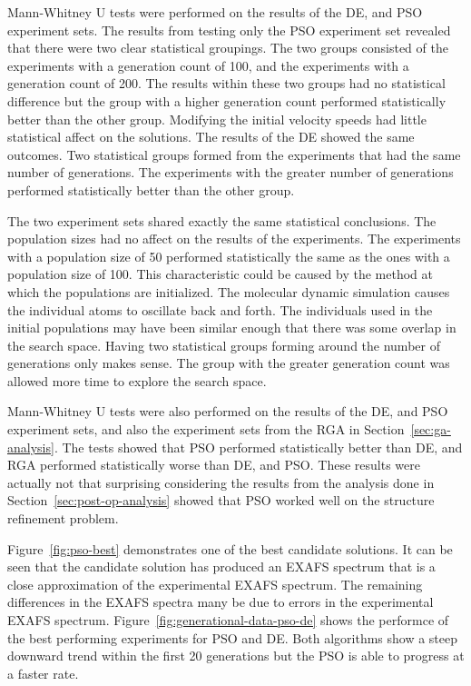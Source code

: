 Mann-Whitney U tests were performed on the results of the DE, and PSO experiment sets. The results from testing only the PSO experiment set revealed that there were two clear statistical groupings. The two groups consisted of the experiments with a generation count of 100, and the experiments with a generation count of 200. The results within these two groups had no statistical difference but the group with a higher generation count performed statistically better than the other group. Modifying the initial velocity speeds had little statistical affect on the solutions. The results of the DE showed the same outcomes. Two statistical groups formed from the experiments that had the same number of generations. The experiments with the greater number of generations performed statistically better than the other group.

The two experiment sets shared exactly the same statistical conclusions. The population sizes had no affect on the results of the experiments. The experiments with a population size of 50 performed statistically the same as the ones with a population size of 100. This characteristic could be caused by the method at which the populations are initialized. The molecular dynamic simulation causes the individual atoms to oscillate back and forth. The individuals used in the initial populations may have been similar enough that there was some overlap in the search space. Having two statistical groups forming around the number of generations only makes sense. The group with the greater generation count was allowed more time to explore the search space.

Mann-Whitney U tests were also performed on the results of the DE, and PSO experiment sets, and also the experiment sets from the RGA in Section~\ref{sec:ga-analysis}. The tests showed that PSO performed statistically better than DE, and RGA performed statistically worse than DE, and PSO. These results were actually not that surprising considering the results from the analysis done in Section~\ref{sec:post-op-analysis} showed that PSO worked well on the structure refinement problem.

Figure~\ref{fig:pso-best} demonstrates one of the best candidate solutions. It can be seen that the candidate solution has produced an EXAFS spectrum that is a close approximation of the experimental EXAFS spectrum. The remaining differences in the EXAFS spectra many be due to errors in the experimental EXAFS spectrum. Figure~\ref{fig:generational-data-pso-de} shows the performce of the best performing experiments for PSO and DE. Both algorithms show a steep downward trend within the first 20 generations but the PSO is able to progress at a faster rate.

